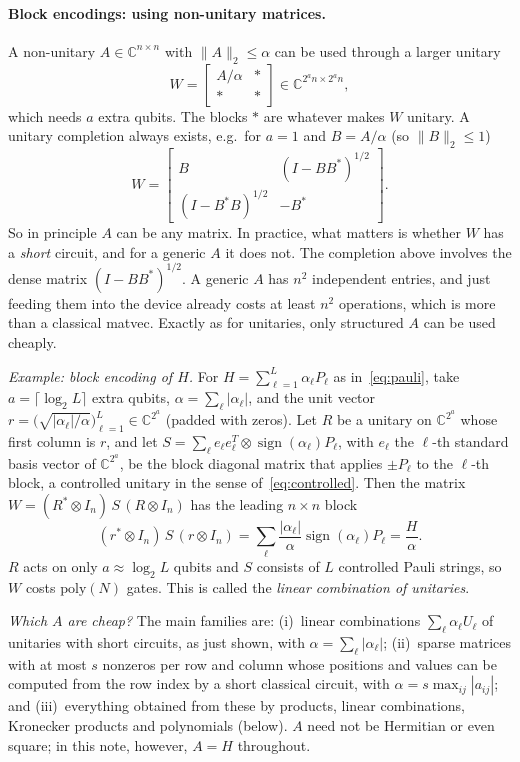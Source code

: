\documentclass[11pt,a4paper]{article}
\newcommand{\C}{\mathbb{C}}
\begin{document}
\paragraph{Block encodings: using non-unitary matrices.} A non-unitary
$A\in\C^{n\times n}$ with $\|A\|_2\le\alpha$ can be used through a larger
unitary
\[
  W = \begin{bmatrix} A/\alpha & *\\ * & *\end{bmatrix}\in\C^{2^an\times 2^an},
\]
which needs $a$ extra qubits. The blocks $*$ are whatever makes $W$
unitary. A unitary completion always exists, e.g.\ for $a=1$ and
$B=A/\alpha$ (so $\|B\|_2\le1$)
\[
  W=\begin{bmatrix}B&(I-BB^*)^{1/2}\\(I-B^*B)^{1/2}&-B^*\end{bmatrix}.
\]
So in principle $A$ can be any matrix. In practice, what matters is
whether $W$ has a \emph{short} circuit, and for a generic $A$ it does not.
The completion above involves the dense matrix $(I-BB^*)^{1/2}$. A generic
$A$ has $n^2$ independent entries, and just feeding them into the device
already costs at least $n^2$ operations, which is more than a classical
matvec. Exactly as for unitaries, only structured $A$ can be used
cheaply.

\emph{Example: block encoding of $H$.} For $H=\sum_{\ell=1}^L\alpha_\ell P_\ell$
as in~\eqref{eq:pauli}, take $a=\lceil\log_2L\rceil$ extra qubits,
$\alpha=\sum_\ell|\alpha_\ell|$, and the unit vector
$r=\big(\sqrt{|\alpha_\ell|/\alpha}\big)_{\ell=1}^L\in\C^{2^a}$ (padded with zeros).
Let $R$ be a unitary on $\C^{2^a}$ whose first column is $r$, and let
$S=\sum_\ell e_\ell e_\ell^T\otimes\operatorname{sign}(\alpha_\ell)P_\ell$, with $e_\ell$ the
$\ell$-th standard basis vector of $\C^{2^a}$, be the block diagonal matrix
that applies $\pm P_\ell$ to the $\ell$-th block, a controlled unitary in the
sense of~\eqref{eq:controlled}. Then
the matrix $W=(R^*\otimes I_n)\,S\,(R\otimes I_n)$ has the leading $n\times n$ block
\[
  (r^*\otimes I_n)\,S\,(r\otimes I_n)=\sum_\ell \frac{|\alpha_\ell|}{\alpha}\operatorname{sign}(\alpha_\ell)P_\ell=\frac{H}{\alpha}.
\]
$R$ acts on only $a\approx\log_2L$ qubits and $S$ consists of $L$
controlled Pauli strings, so $W$ costs $\mathrm{poly}(N)$ gates. This is
called the \emph{linear combination of unitaries}.

\emph{Which $A$ are cheap?} The main families are:
(i)~linear combinations $\sum_\ell\alpha_\ell U_\ell$ of unitaries with short
circuits, as just shown, with $\alpha=\sum_\ell|\alpha_\ell|$;
(ii)~sparse matrices with at most $s$ nonzeros per row and column whose
positions and values can be computed from the row index by a short
classical circuit, with $\alpha=s\max_{ij}|a_{ij}|$; and
(iii)~everything obtained from these by products, linear combinations,
Kronecker products and polynomials (below). $A$ need not be Hermitian or
even square; in this note, however, $A=H$ throughout.
\end{document}
